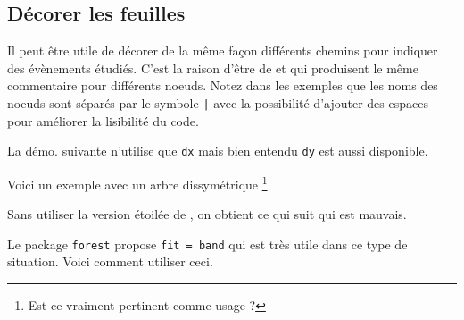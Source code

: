 \documentclass[12pt,a4paper]{article}
\begin{document}

\subsection{Décorer les feuilles}

Il peut être utile de décorer de la même façon différents chemins pour indiquer des évènements étudiés.
C'est la raison d'être de  et  qui produisent le même commentaire pour différents noeuds.
Notez dans les exemples que les noms des noeuds sont séparés par le symbole \verb+|+ avec la possibilité d'ajouter des espaces pour améliorer la lisibilité du code.








La démo. suivante n'utilise que \verb#dx# mais bien entendu \verb#dy# est aussi disponible.






Voici un exemple avec un arbre dissymétrique
\footnote{
	Est-ce vraiment pertinent comme usage ?
}.



\begin{remark}
	Sans utiliser la version étoilée de , on obtient ce qui suit qui est mauvais.

	\begin{center}
		
	\end{center}
	
	Le package \verb#forest# propose \verb#fit = band# qui est très utile dans ce type de situation.
	Voici comment utiliser ceci.
	
\end{remark}
 
\end{document}
